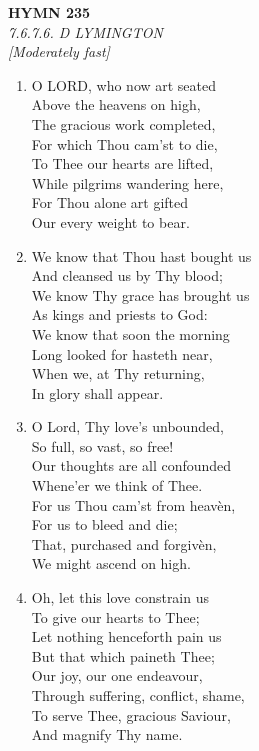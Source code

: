 \newpage
\begin{center}
    {\Large \textbf{HYMN 235}}
    \\
    \textit{7.6.7.6. D LYMINGTON}
    \\
    \textit{\small [Moderately fast]}
\end{center}
\vspace{1em}

\begin{enumerate}
    \item O LORD, who now art seated \\
            Above the heavens on high, \\
        The gracious work completed, \\
            For which Thou cam'st to die, \\
        To Thee our hearts are lifted, \\
            While pilgrims wandering here, \\
        For Thou alone art gifted \\
            Our every weight to bear.

    \item We know that Thou hast bought us \\
            And cleansed us by Thy blood; \\
        We know Thy grace has brought us \\
            As kings and priests to God: \\
        We know that soon the morning \\
            Long looked for hasteth near, \\
        When we, at Thy returning, \\
            In glory shall appear.

    \item O Lord, Thy love's unbounded, \\
            So full, so vast, so free! \\
        Our thoughts are all confounded \\
            Whene'er we think of Thee. \\
        For us Thou cam'st from heav\`en, \\
            For us to bleed and die; \\
        That, purchased and forgiv\`en, \\
            We might ascend on high.

    \item Oh, let this love constrain us \\
            To give our hearts to Thee; \\
        Let nothing henceforth pain us \\
            But that which paineth Thee; \\
        Our joy, our one endeavour, \\
            Through suffering, conflict, shame, \\
        To serve Thee, gracious Saviour, \\
            And magnify Thy name.

\end{enumerate}

